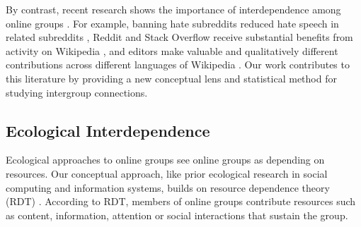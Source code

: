\documentclass[letterpaper]{article}\usepackage[]{graphicx}\usepackage[]{color}
\begin{document}
By contrast, recent research shows the importance of interdependence among online groups \cite{kairam_life_2012, tan_tracing_2018, waller_generalists_2019}. 
For example, banning hate subreddits reduced hate speech in related subreddits \cite{chandrasekharan_you_2017}, Reddit and Stack Overflow receive substantial benefits from activity on Wikipedia \cite{vincent_examining_2018}, and editors make valuable and qualitatively different contributions across different languages of Wikipedia \cite{hale_cross-language_2015}. 
Our work contributes to this literature by providing a new conceptual lens and statistical method for studying intergroup connections. 


\subsection{Ecological Interdependence}
\label{sec:rdp}

Ecological approaches to online groups see online groups as depending on resources. Our conceptual approach, like prior ecological research in social computing and information systems, builds on resource dependence theory (RDT) \cite{butler_membership_2001, wang_impact_2012}. 
According to RDT, members of online groups contribute resources such as content, information, attention or social interactions that sustain the group.  

\end{document}
